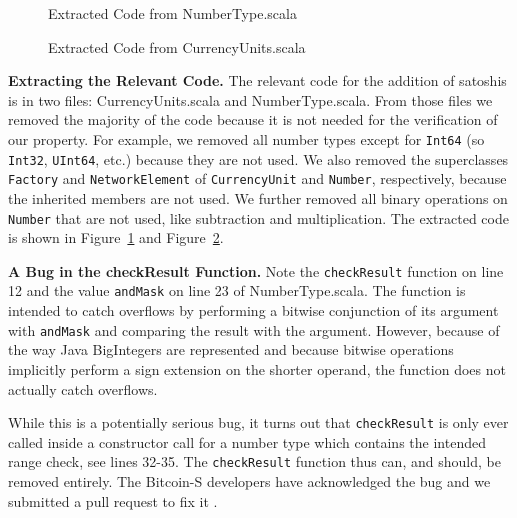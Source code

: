 \documentclass[hyphens, a4paper,USenglish,cleveref, autoref, thm-restate]{oasics-v2019}
\renewcommand{\paragraph}{\textbf}%
\begin{document}
\begin{figure}

  \caption{Extracted Code from NumberType.scala}
  \label{fig:numbertype}
\end{figure}

\begin{figure}

  \caption{Extracted Code from CurrencyUnits.scala}
  \label{fig:currencyunits}
\end{figure}

\paragraph{Extracting the Relevant Code.} The relevant code for the
addition of satoshis is in two files: CurrencyUnits.scala and
NumberType.scala. From those files we removed the majority of the code
because it is not needed for the verification of our property. For
example, we removed all number types except for \texttt{Int64} (so
\texttt{Int32}, \texttt{UInt64}, etc.) because they are not used. We
also removed the superclasses \texttt{Factory} and
\texttt{NetworkElement} of \texttt{CurrencyUnit} and \texttt{Number},
respectively, because the inherited members are not used. We further
removed all binary operations on \texttt{Number} that are not used,
like subtraction and multiplication. The extracted code is shown in
Figure~\ref{fig:numbertype} and Figure~\ref{fig:currencyunits}.

\paragraph{A Bug in the checkResult Function.} Note the
\texttt{checkResult} function on line 12 and the value
\texttt{andMask} on line 23 of NumberType.scala. The function is
intended to catch overflows by performing a bitwise conjunction of its
argument with \texttt{andMask} and comparing the result with the
argument. However, because of the way Java BigIntegers are represented
\cite{wikipedia:twocomp} and because bitwise operations implicitly
perform a sign extension \cite{java:bigint} on the shorter operand,
the function does not actually catch overflows.

While this is a potentially serious bug, it turns out that
\texttt{checkResult} is only ever called inside a constructor call for
a number type which contains the intended range check, see lines
32-35. The \texttt{checkResult} function thus can, and should, be
removed entirely. The Bitcoin-S developers have acknowledged the bug
and we submitted a pull request to fix it \cite{BitcoinS:pull565}.
\end{document}
